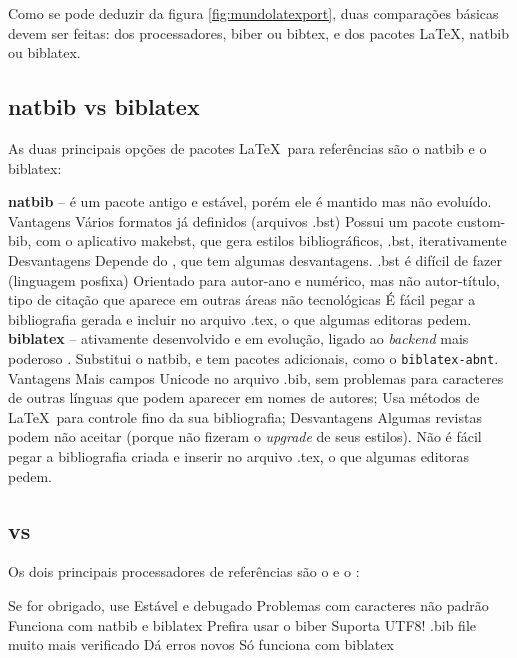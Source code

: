 Como se pode deduzir da figura \ref{fig:mundolatexport}, duas comparações básicas devem ser feitas: dos processadores, biber ou bibtex, e dos pacotes \LaTeX, natbib ou biblatex.

\subsection{natbib vs biblatex}

As duas principais opções de pacotes \LaTeX\    
para referências são o natbib e o biblatex\parencite{biber:2012}:



\begin{outline}
    \1 \textbf{natbib} -- é um pacote antigo e estável, porém ele é  mantido mas não evoluído. 
    \2 Vantagens
    \3 Vários formatos já definidos (arquivos .bst)
    \3 Possui um pacote custom-bib, com o aplicativo makebst, que gera estilos bibliográficos, .bst, iterativamente
    \2 Desvantagens
    \3 Depende do , que tem algumas desvantagens.
    \3 .bst é difícil de fazer (linguagem posfixa)
    \3 Orientado para autor-ano e numérico, mas não autor-título, tipo de citação que aparece em outras áreas não tecnológicas
    \3 É fácil pegar a bibliografia gerada e incluir no arquivo .tex, o que algumas editoras pedem.
    \1 \textbf{biblatex} -- ativamente desenvolvido e em evolução, ligado
    ao \textit{backend} mais poderoso \hologo{biber}. Substitui o natbib, e tem pacotes adicionais, como o \lstinline|biblatex-abnt|.
    \2 Vantagens
    \3 Mais campos
    \3 Unicode no arquivo .bib, sem problemas para caracteres de outras línguas que podem aparecer em nomes de autores;
    \3 Usa métodos de \LaTeX\ para controle fino da sua bibliografia;
    \2 Desvantagens
    \3 Algumas revistas podem não aceitar (porque não fizeram o
     \textit{upgrade} de seus estilos).
    \3 Não é fácil pegar a bibliografia criada e inserir no arquivo .tex, o que algumas editoras pedem.
\end{outline}


\subsection{\hologo{BibTeX} vs \hologo{biber}}

Os dois principais processadores de referências são o \hologo{BibTeX} e o  \hologo{biber}:
\begin{outline}
    \1 
    \2 Se for obrigado, use 
    \2 Estável e debugado
    \2 Problemas com caracteres não padrão 
    \2 Funciona com natbib e biblatex
    \1 
    \2 Prefira usar o  biber
    \2 Suporta UTF8!
    \2 .bib file muito mais verificado
    \3 Dá erros novos
    \2 Só funciona com biblatex
\end{outline}



